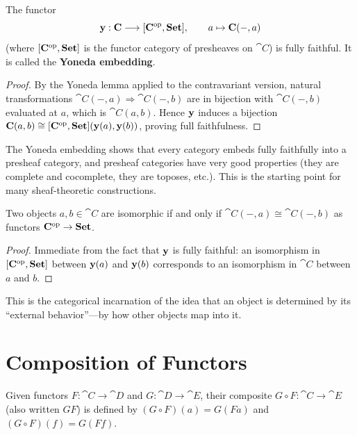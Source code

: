 \begin{corollary}
\label{cor:yoneda-embedding}
The functor
\[
  \mathbf{y}: \mathbf{C} \longrightarrow [\mathbf{C}^{\mathrm{op}}, \mathbf{Set}], \qquad a \mapsto \mathbf{C}(-, a)
\]
(where $[\mathbf{C}^{\mathrm{op}}, \mathbf{Set}]$ is the functor category of presheaves on $\cat{C}$) is fully faithful. It is called the \textbf{Yoneda embedding}.
\end{corollary}

\begin{proof}
By the Yoneda lemma applied to the contravariant version, natural transformations $\cat{C}(-,a) \Rightarrow \cat{C}(-,b)$ are in bijection with $\cat{C}(-,b)$ evaluated at $a$, which is $\cat{C}(a,b)$. Hence $\mathbf{y}$ induces a bijection $\mathbf{C}(a,b) \cong [\mathbf{C}^{\mathrm{op}},\mathbf{Set}](\mathbf{y}(a), \mathbf{y}(b))$, proving full faithfulness.
\end{proof}

The Yoneda embedding shows that every category embeds fully faithfully into a presheaf category, and presheaf categories have very good properties (they are complete and cocomplete, they are toposes, etc.). This is the starting point for many sheaf-theoretic constructions.

\begin{corollary}
Two objects $a, b \in \cat{C}$ are isomorphic if and only if $\cat{C}(-, a) \cong \cat{C}(-, b)$ as functors $\mathbf{C}^{\mathrm{op}} \to \mathbf{Set}$.
\end{corollary}

\begin{proof}
Immediate from the fact that $\mathbf{y}$ is fully faithful: an isomorphism in $[\mathbf{C}^{\mathrm{op}},\mathbf{Set}]$ between $\mathbf{y}(a)$ and $\mathbf{y}(b)$ corresponds to an isomorphism in $\cat{C}$ between $a$ and $b$.
\end{proof}

This is the categorical incarnation of the idea that an object is determined by its ``external behavior''—by how other objects map into it.

\section{Composition of Functors}

\begin{definition}
Given functors $F: \cat{C} \to \cat{D}$ and $G: \cat{D} \to \cat{E}$, their composite $G \circ F: \cat{C} \to \cat{E}$ (also written $GF$) is defined by $(G \circ F)(a) = G(Fa)$ and $(G \circ F)(f) = G(Ff)$.
\end{definition}

